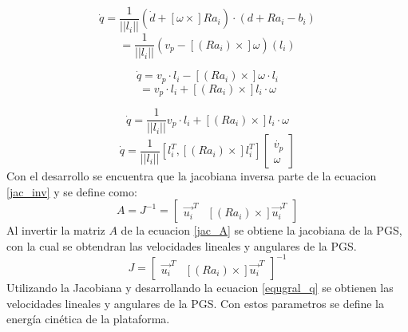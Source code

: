 \begin{equation}
\dot{q}=\frac{1}{||l_i||}(\dot{d} + [\omega \times] Ra_i)\cdot(d + Ra_i -b_i) 
\end{equation}
\begin{equation*}
= \frac{1}{||l_i||}(v_p - [(Ra_i)\times]\omega)(l_i)
\end{equation*}

\begin{equation}
\dot{q} = v_p \cdot l_i - [(Ra_i)\times]\omega \cdot l_i 
\end{equation}
\begin{equation*}
= v_p \cdot l_i + [(Ra_i)\times]l_i \cdot \omega
\end{equation*}

\begin{equation}
\dot{q} = \frac{1}{||l_i||} v_p \cdot l_i + [(Ra_i)\times]l_i \cdot \omega
\end{equation}
\begin{equation} \label{jac_inv}
\dot{q} = \frac{1}{||l_i||} [l_i^T , [(Ra_i)\times]l_i^T] \begin{bmatrix}
\dot{v_p}\\
\omega
\end{bmatrix}
\end{equation}
Con el desarrollo se encuentra que la jacobiana inversa parte de la ecuacion \ref{jac_inv} y se define como:
\begin{equation}\label{jac_A}
A = J^{-1} = \begin{bmatrix}
\vec{u_i}^T & [(Ra_i)\times]\vec{u_i}^T
\end{bmatrix}
\end{equation}
Al invertir la matriz $A$ de la ecuacion \ref{jac_A} se obtiene la jacobiana de la PGS, con la cual se obtendran las velocidades lineales y angulares de la PGS.
\begin{equation*}
J = \begin{bmatrix}
\vec{u_i}^T & [(Ra_i)\times]\vec{u_i}^T
\end{bmatrix}^{-1}
\end{equation*}
Utilizando la Jacobiana y desarrollando la ecuacion \ref{equgral_q} se obtienen las velocidades lineales y angulares de la PGS. Con estos parametros se define la energía cinética de la plataforma.